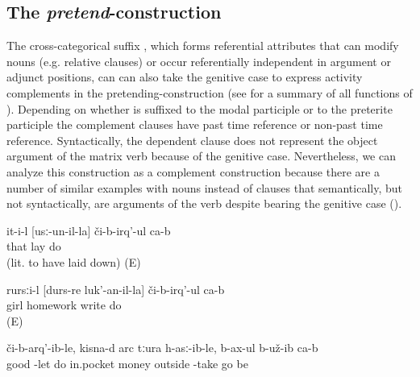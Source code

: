 
\subsection{The \textit{pretend}-construction}
\label{ssec:PretendConstruction}
The cross-categorical suffix , which forms referential attributes that can modify nouns (e.g. relative clauses) or occur referentially independent in argument or adjunct positions, can can also take the genitive case to express activity complements in the pretending-construction  (see  for a summary of all functions of ). Depending on whether  is suffixed to the modal participle  or to the preterite participle  the complement clauses have past time reference or non-past time reference. Syntactically, the dependent clause does not represent the object argument of the matrix verb  because of the genitive case. Nevertheless, we can analyze this construction as a complement construction because there are a number of similar examples with nouns instead of clauses that semantically, but not syntactically, are arguments of the verb  despite bearing the genitive case ().
%
\begin{exe}

	\ex	\label{ex:‎‎‎He pretends to sleep (lit. to have laid down)}
	\gll	it-i-l	[usː-un-il-la]	či-b-irq'-ul	ca-b\\
		that	lay	do	\\
	\glt	{} (lit. to have laid down) (E)
	
	\ex	\label{ex:‎‎‎The girl pretends to make the homework}
	\gll	rursːi-l	[durs-re	luk'-an-il-la]	či-b-irq'-ul	ca-b\\
		girl	homework	write	do	\\
	\glt	{} (E)


	\ex	\label{ex:‎‎‎Apparently they pretended to make him to put him (to bed) well, took the money that was in his pocket and left}
		či-b-arq'-ib-le,	kisna-d	arc	tːura	h-asː-ib-le, b-ax-ul	b-už-ib	ca-b\\
		good	-let	do		in.pocket	money	outside	-take	\tsc{hpl-}go	be		\\
	\glt	{}
\end{exe}

